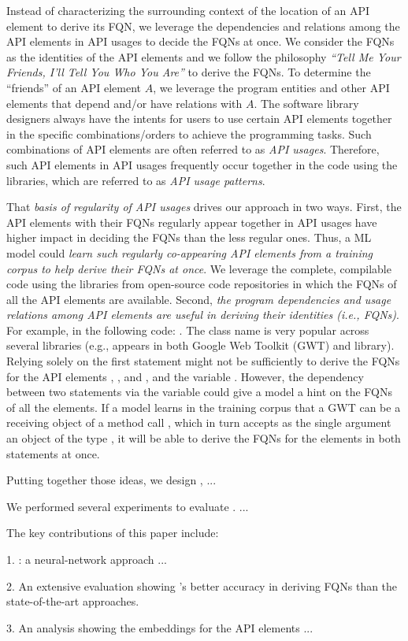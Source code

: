 Instead of characterizing the surrounding context of the location of
an API element to derive its FQN, we leverage the dependencies and
relations among the API elements in API usages to decide the FQNs at
once. We consider the FQNs as the identities of the API elements and
we follow the philosophy {\em ``Tell Me Your Friends, I'll Tell You
  Who You Are''} to derive the FQNs. To determine the ``friends'' of
an API element $A$, we leverage the program entities and other API
elements that depend and/or have relations with $A$. The software
library designers always have the intents for users to use certain API
elements together in the specific combinations/orders to achieve the
programming tasks. Such combinations of API elements are often
referred to as {\em API usages}. Therefore, such API elements in API
usages frequently occur together in the code using the libraries,
which are referred to as {\em API usage patterns}.

That {\em basis of regularity of API usages} drives our approach in
two ways. First, the API elements with their FQNs regularly appear
together in API usages have higher impact in deciding the FQNs than
the less regular ones. Thus, a ML model could {\em learn such regularly
co-appearing API elements from a training corpus to help derive their
FQNs at once}. We leverage the complete, compilable code using the
libraries from open-source code repositories in which the FQNs of all
the API elements are available. Second, {\em the program dependencies and
usage relations among API elements are useful in deriving their
identities (i.e., FQNs)}. For example, in the following code:
 . The class name  is very popular
  across several libraries (e.g.,  appears in both Google
  Web Toolkit (GWT) and  library). Relying solely on the
  first statement might not be sufficiently to derive the FQNs for the
  API elements , , and
  , and the variable . However, the
   dependency between two statements via the variable
   could give a model a hint on the FQNs of all the elements.
  If a model learns in the training corpus that a GWT 
  can be a receiving object of a method call ,
  which in turn accepts as the single argument an object of the type
  , it will be able to derive the FQNs for the
  elements in both statements at once.

Putting together those ideas, we design {\tool}, ...

We performed several experiments to evaluate {\tool}. ...

The key contributions of this paper include:

1. {\tool}: a neural-network approach ...


2. An extensive evaluation showing {\tool}'s better accuracy in
deriving FQNs than the state-of-the-art approaches.

3. An analysis showing the embeddings for the API elements ...
